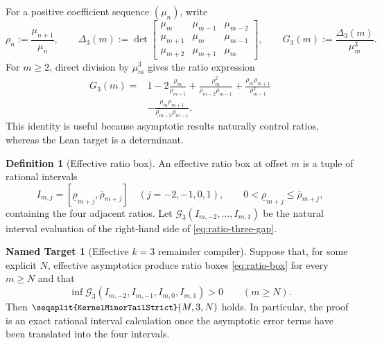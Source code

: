 \documentclass[11pt,a4paper]{article}
\theoremstyle{definition}
\newtheorem{definition}[theorem]{Definition}
\newtheorem{target}[theorem]{Named Target}
\newcommand{\Lean}[1]{\texttt{\small\seqsplit{#1}}}
\begin{document}
For a positive coefficient sequence $(\mu_n)$, write
\begin{equation}
  \rho_n := \frac{\mu_{n+1}}{\mu_n},\qquad
  \Delta_3(m):=\det\!\begin{bmatrix}
    \mu_m&\mu_{m-1}&\mu_{m-2}\\
    \mu_{m+1}&\mu_m&\mu_{m-1}\\
    \mu_{m+2}&\mu_{m+1}&\mu_m
  \end{bmatrix},\qquad
  G_3(m):=\frac{\Delta_3(m)}{\mu_m^3}.
  \label{eq:normalized-three-gap}
\end{equation}
For $m\ge2$, direct division by $\mu_m^3$ gives the ratio expression
\begin{equation}
\begin{split}
G_3(m)={}&1-2\frac{\rho_m}{\rho_{m-1}}
 +\frac{\rho_m^2}{\rho_{m-2}\rho_{m-1}}
 +\frac{\rho_m\rho_{m+1}}{\rho_{m-1}^2}\\[-0.2em]
&-\frac{\rho_m\rho_{m+1}}{\rho_{m-2}\rho_{m-1}}.
\end{split}
\label{eq:ratio-three-gap}
\end{equation}
This identity is useful because asymptotic results naturally control ratios,
whereas the Lean target is a determinant.

\begin{definition}[Effective ratio box]
An effective ratio box at offset $m$ is a tuple of rational intervals
\begin{equation}
  I_{m,j}=[\underline\rho_{m+j},\overline\rho_{m+j}]
  \quad (j=-2,-1,0,1),
  \qquad 0<\underline\rho_{m+j}\le\overline\rho_{m+j},
  \label{eq:ratio-box}
\end{equation}
containing the four adjacent ratios.  Let $\mathcal G_3(I_{m,-2},\ldots,I_{m,1})$
be the natural interval evaluation of the right-hand side of
\eqref{eq:ratio-three-gap}.
\end{definition}

\begin{target}[Effective $k=3$ remainder compiler]
Suppose that, for some explicit $N$, effective asymptotics produce ratio boxes
\eqref{eq:ratio-box} for every $m\ge N$ and that
\begin{equation}
  \inf\mathcal G_3(I_{m,-2},I_{m,-1},I_{m,0},I_{m,1})>0
  \qquad(m\ge N).
  \label{eq:positive-three-tail}
\end{equation}
Then $\Lean{KernelMinorTailStrict}(M,3,N)$ holds.  In particular, the
proof is an exact rational interval calculation once the asymptotic error
terms have been translated into the four intervals.
\end{target}
\end{document}
